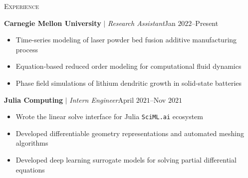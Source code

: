 \documentclass[10pt]{article}
\begin{document}
\begin{multicols}{2}
\textsc{Experience}
\columnbreak

\textbf{Carnegie Mellon University} $|$ \textit{Research Assistant}\hfill Jan $2022$--Present

\vspace{-1.75em}
\begin{itemize}[label=-,leftmargin=1.0em]
    \setlength\itemsep{-0.25em}
    \item Time-series modeling of laser powder bed fusion additive manufacturing process
    \item Equation-based reduced order modeling for computational fluid dynamics
    \item Phase field simulations of lithium dendritic growth in solid-state batteries
\end{itemize}
\vspace{-2.0em}

\vspace{0.5em}
\textbf{Julia Computing} $|$ \textit{Intern Engineer}\hfill April $2021$--Nov $2021$

\vspace{-1.75em}
\begin{itemize}[label=-,leftmargin=1.0em]
    \setlength\itemsep{-0.25em}
    \item Wrote the linear solve interface for Julia \texttt{SciML.ai} ecosystem
    \item Developed differentiable geometry representations and automated meshing algorithms
    \item Developed deep learning surrogate models for solving partial differential equations
\end{itemize}
\vspace{-2.0em}

%


\end{multicols}
\end{document}
